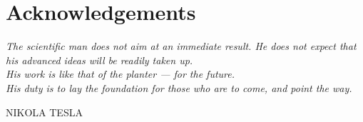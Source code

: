 \chapter*{Acknowledgements}

{
\null\vfill\hfill
\settowidth{}
\centering
\parbox{\longest}{%
  \raggedright{\itshape%
  The scientific man does not aim
  at an immediate result. He does not
  expect that his advanced ideas
  will be readily taken up. \\
  \vspace{\baselineskip}
  His work is like that of the planter --- for the future. \\ 
  His duty is to lay the foundation for those who are to come, and point the way.\par\bigskip
  }   
  \raggedleft\MakeUppercase{Nikola Tesla}\par%
}
}
